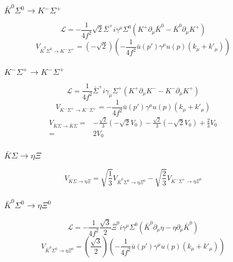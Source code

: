 \subsubsection{$\bar{K}^{0}\Sigma^{0}\rightarrow K^{-}\Sigma^{+}$}
\begin{equation}
	\mathcal{L}=-\frac{1}{4f^2}\sqrt{2}\bar{\Sigma}^{+}i\gamma^{\mu}\Sigma^{0}(K^{+}\partial_{\mu}\bar{K}^{0}-\bar{K}^{0}\partial_{\mu}K^{+})
\end{equation}
\begin{equation}
	V_{\bar{K}^{0}\Sigma^{0}\rightarrow K^{-}\Sigma^{+}}=\left(-\sqrt{2}\right)\left(-\frac{1}{4f^2}\bar{u}(p')\gamma^{\mu}u(p)(k_{\mu}+k'_{\mu})\right)
\end{equation}
\subsubsection{$K^{-}\Sigma^{+}\rightarrow K^{-}\Sigma^{+}$}
\begin{equation}
	\mathcal{L}=\frac{1}{4f^2}\bar{\Sigma}^{+}i\gamma_{\mu}\Sigma^{+}(K^{+}\partial_{\mu}K^{-}-K^{-}\partial_{\mu}K^{+})
\end{equation}
\begin{equation}
	V_{K^{-}\Sigma^{+}\rightarrow K^{-}\Sigma^{+}}=-\frac{1}{4f^2}\bar{u}(p')\gamma^{\mu}u(p)(k_{\mu}+k'_{\mu})
\end{equation}
\begin{equation}
\begin{split}
	V_{\bar{K}\Sigma\rightarrow \bar{K}\Sigma}=&-\frac{\sqrt{2}}{3}(-\sqrt{2}V_{0})-\frac{\sqrt{2}}{3}(-\sqrt{2}V_{0})+\frac{2}{3}V_{0}\\
	=&2V_{0}
\end{split}
\end{equation}
\subsubsection{$\bar{K}\Sigma\rightarrow\eta\Xi$}
\begin{equation}
	V_{\bar{K}\Sigma\rightarrow\eta\Xi}=\sqrt{\frac{1}{3}}V_{\bar{K}^{0}\Sigma^{0}\rightarrow\eta\Xi^{0}}-\sqrt{\frac{2}{3}}V_{K^{-}\Sigma^{+}\rightarrow\eta\Xi^{0}}
\end{equation}
\subsubsection{$\bar{K}^{0}\Sigma^{0}\rightarrow\eta\Xi^{0}$}
\begin{equation}
	\mathcal{L}=-\frac{1}{4f^2}\frac{\sqrt{3}}{2}\bar{\Xi}^{0}i\gamma^{\mu}\Sigma^{0}(\bar{K}^{0}\partial_{\mu}\eta-\eta\partial_{\mu}\bar{K}^{0})
\end{equation}
\begin{equation}
	V_{\bar{K}^{0}\Sigma^{0}\rightarrow\eta\Xi^{0}}=\left(\frac{\sqrt{3}}{2}\right)\left(-\frac{1}{4f^2}\bar{u}(p')\gamma^{\mu}u(p)(k_{\mu}+k'_{\mu})\right)
\end{equation}
